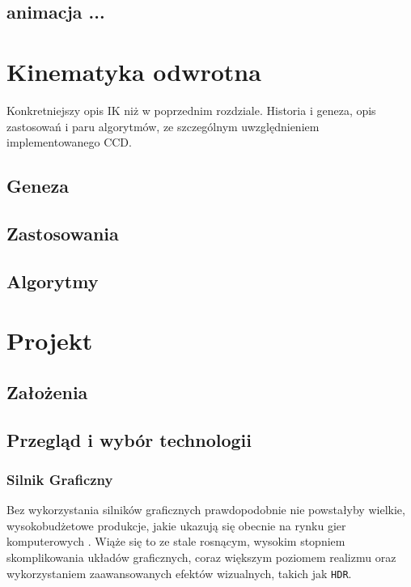 \documentclass[11pt]{mwrep}
\begin{document}
  \section{animacja ...}
  
\chapter{Kinematyka odwrotna}
Konkretniejszy opis IK niż w poprzednim rozdziale. Historia i geneza, opis zastosowań i paru algorytmów, ze szczególnym uwzględnieniem implementowanego CCD.
  \section{Geneza}
  \section{Zastosowania}
  \section{Algorytmy}

\chapter{Projekt}
  \section{Założenia}
  \section{Przegląd i wybór technologii}
    \subsection{Silnik Graficzny}
    Bez wykorzystania silników graficznych prawdopodobnie nie powstałyby wielkie, wy\-so\-ko\-bud\-że\-to\-we produkcje, jakie ukazują się obecnie na rynku gier komputerowych	. Wiąże się to ze stale rosnącym, wysokim stopniem skomplikowania układów graficznych, coraz większym poziomem realizmu oraz wykorzystaniem zaawansowanych efektów wizualnych, takich jak \texttt{HDR}.
\end{document}
